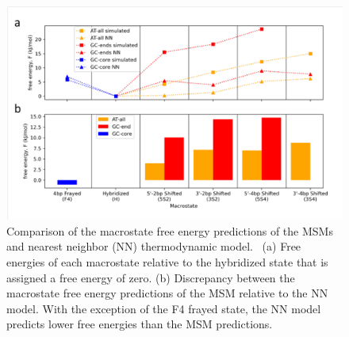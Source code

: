 \documentclass[journal=jpcbfk,manuscript=article]{achemso}
\newcommand*{\bood}[1]{{\color{blue}{#1}}}
\begin{document}


\begin{figure}[ht!]
	\begin{center} 
        \includegraphics[width=160mm, scale=1]{Fig3.pdf}
        \caption{Comparison of the macrostate free energy predictions of the MSMs and nearest neighbor (NN) thermodynamic model.~\citep{SantaLucia1998AThermodynamics, Santalucia2004TM} (a) Free energies of each macrostate relative to the hybridized state that is assigned a free energy of zero. (b) Discrepancy between the macrostate free energy predictions of the MSM relative to the NN model. With the exception of the F4 frayed state, the NN model predicts lower free energies than the MSM predictions.}
        \label{fig:NN_table}
	\end{center}
\end{figure}
\end{document}
